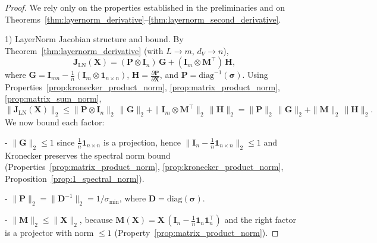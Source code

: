 \documentclass{article}
\begin{document}
\begin{proof}
We rely only on the properties established in the preliminaries and on Theorems~\ref{thm:layernorm_derivative}--\ref{thm:layernorm_second_derivative}.

1) LayerNorm Jacobian structure and bound.
By Theorem~\ref{thm:layernorm_derivative} (with $L\!\to\! m$, $d_V\!\to\! n$),
\[\mathbf{J}_{\mathrm{LN}}(\mathbf{X})= (\mathbf{P}\otimes \mathbf{I}_n)\,\mathbf{G}+ (\mathbf{I}_m\otimes \mathbf{M}^\top)\,\mathbf{H},\]
where $\mathbf{G}=\mathbf{I}_{mn}-\tfrac{1}{n}(\mathbf{I}_m\otimes \mathbf{1}_{n\times n})$,
$\mathbf{H}=\tfrac{\partial \mathbf{P}}{\partial \mathbf{X}}$, and $\mathbf{P}=\mathrm{diag}^{-1}(\boldsymbol{\sigma})$.
Using Properties~\ref{prop:kronecker_product_norm}, \ref{prop:matrix_product_norm}, \ref{prop:matrix_sum_norm},
\[\|\mathbf{J}_{\mathrm{LN}}(\mathbf{X})\|_2\le \|\mathbf{P}\otimes \mathbf{I}_n\|_2\,\|\mathbf{G}\|_2 + \|\mathbf{I}_m\otimes \mathbf{M}^\top\|_2\,\|\mathbf{H}\|_2= \|\mathbf{P}\|_2\,\|\mathbf{G}\|_2 + \|\mathbf{M}\|_2\,\|\mathbf{H}\|_2.\]
We now bound each factor:

- $\|\mathbf{G}\|_2\le 1$ since $\tfrac{1}{n}\mathbf{1}_{n\times n}$ is a projection, hence $\|\mathbf{I}_n-\tfrac{1}{n}\mathbf{1}_{n\times n}\|_2\le 1$ and Kronecker preserves the spectral norm bound (Properties~\ref{prop:matrix_product_norm}, \ref{prop:kronecker_product_norm}, Proposition~\ref{prop:1_spectral_norm}).

- $\|\mathbf{P}\|_2 = \|\mathbf{D}^{-1}\|_2 = 1/\sigma_{\min}$, where $\mathbf{D}=\mathrm{diag}(\boldsymbol{\sigma})$.

- $\|\mathbf{M}\|_2 \le \|\mathbf{X}\|_2$, because $\mathbf{M}(\mathbf{X}) = \mathbf{X}\,(\mathbf{I}_n - \tfrac{1}{n}\mathbf{1}_n\mathbf{1}_n^\top)$ and the right factor is a projector with norm $\le 1$ (Property~\ref{prop:matrix_product_norm}).


\end{proof}
\end{document}
